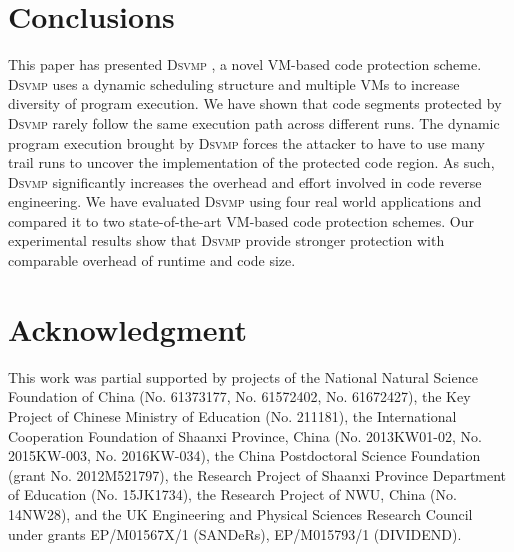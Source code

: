 \documentclass[preprint,12pt,3p]{elsarticle}
\newcommand{\DSVMP}{\textsc{Dsvmp }}
\begin{document}
\section{Conclusions}\label{sec:con}
This paper has presented \DSVMP, a novel VM-based code protection scheme.
\DSVMP uses a dynamic scheduling structure and multiple VMs to increase
diversity of program execution. We have shown that code
segments protected by \DSVMP rarely follow the same execution path across
different runs. The dynamic program execution brought by \DSVMP forces the attacker
to have to use many trail runs to uncover the implementation of the protected code
region. As such, \DSVMP significantly increases the overhead and effort
involved in code reverse engineering. We have evaluated \DSVMP using four
real world applications and compared it to two state-of-the-art VM-based code
protection schemes. Our experimental results show that \DSVMP provide
stronger protection with comparable overhead of runtime and code size.

\section*{Acknowledgment}
This work was partial supported by projects of the National Natural Science Foundation of China 
(No. 61373177, No. 61572402, No. 61672427),
the Key Project of Chinese Ministry of Education (No. 211181),
the International Cooperation Foundation of Shaanxi Province, China (No. 2013KW01-02, No. 2015KW-003, No. 2016KW-034),
the China Postdoctoral Science Foundation (grant No. 2012M521797),
the Research Project of Shaanxi Province Department of Education (No. 15JK1734),
the Research Project of NWU, China (No. 14NW28),
and the UK Engineering and Physical Sciences Research Council under grants EP/M01567X/1 (SANDeRs), EP/M015793/1 (DIVIDEND).








% 
% 
% 
% 
% 
% 
% 
% 
% 
% 
% 
% 


\end{document}
